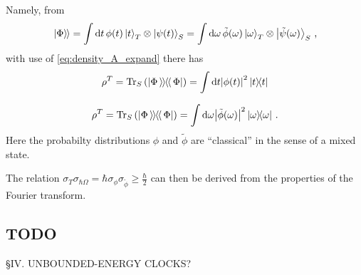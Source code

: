 Namely, from
\begin{equation}
  \left.\left| \Phi \right\rangle\hspace{-0.115em}\right\rangle =
    \int \dd{t} \phi(t) \ket{t}_T \otimes \ket{\psi(t)}_S =
    \int \dd \omega \, \tilde{\phi}(\omega) \ket{\omega}_T \otimes \ket{\tilde{\psi}(\omega)}_S \, \text{,}
\end{equation}
with use of \eqref{eq:density_A_expand} there has
\[
  \rho^T = \Tr_S\qty(\left| \Phi \left\rangle\hspace{-0.115em}\left\rangle \hspace{-0.115em} \right\langle\hspace{-0.115em}\right\langle \Phi \right|) = \int \dd t \abs{\phi(t)}^2 \ketbra{t}{t} 
\]

\[
  \rho^T = \Tr_S\qty(\left| \Phi \left\rangle\hspace{-0.115em}\left\rangle \hspace{-0.115em} \right\langle\hspace{-0.115em}\right\langle \Phi \right|) = \int \dd \omega \abs{\tilde{\phi}(\omega)}^2 \ketbra{\omega}{\omega}
  \,\text{.} 
\]
Here the probabilty distributions $\phi$ and $\tilde{\phi}$
are ``classical'' in the sense of a mixed state.

The relation $\sigma_T\sigma_{\hbar\Omega} = \hbar \sigma_{\phi} \sigma_{\tilde{\phi}} \geq \frac{\hbar}{2}$
can then be derived from the properties of the Fourier transform.

\subsection{TODO}
\cite{Maccone:Pauli} \S IV.  UNBOUNDED-ENERGY CLOCKS?